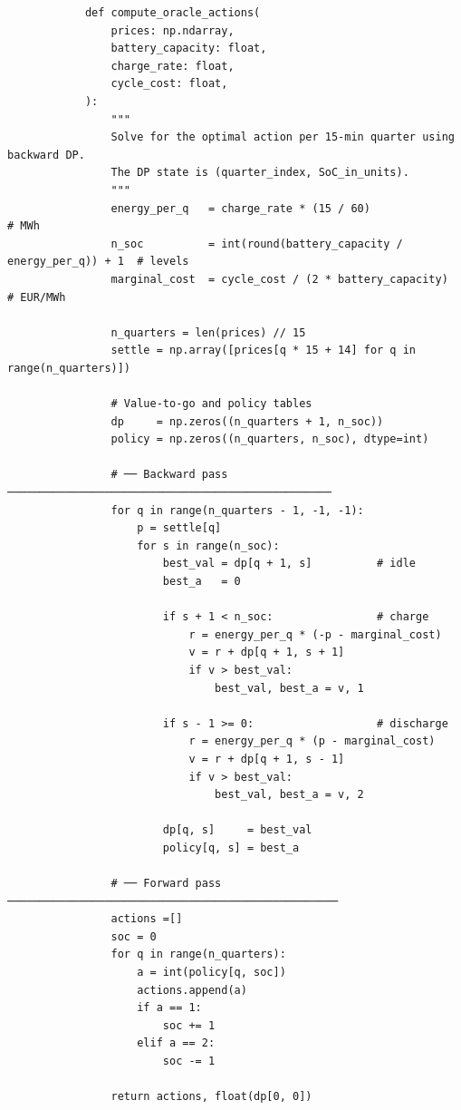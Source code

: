             \begin{listing}[ht]
            \begin{verbatim}
            def compute_oracle_actions(
                prices: np.ndarray,
                battery_capacity: float,
                charge_rate: float,
                cycle_cost: float,
            ):
                """
                Solve for the optimal action per 15-min quarter using backward DP.
                The DP state is (quarter_index, SoC_in_units).
                """
                energy_per_q   = charge_rate * (15 / 60)                          # MWh
                n_soc          = int(round(battery_capacity / energy_per_q)) + 1  # levels
                marginal_cost  = cycle_cost / (2 * battery_capacity)              # EUR/MWh
            
                n_quarters = len(prices) // 15
                settle = np.array([prices[q * 15 + 14] for q in range(n_quarters)])
            
                # Value-to-go and policy tables
                dp     = np.zeros((n_quarters + 1, n_soc))
                policy = np.zeros((n_quarters, n_soc), dtype=int)
            
                # ── Backward pass ──────────────────────────────────────────────────
                for q in range(n_quarters - 1, -1, -1):
                    p = settle[q]
                    for s in range(n_soc):
                        best_val = dp[q + 1, s]          # idle
                        best_a   = 0
            
                        if s + 1 < n_soc:                # charge
                            r = energy_per_q * (-p - marginal_cost)
                            v = r + dp[q + 1, s + 1]
                            if v > best_val:
                                best_val, best_a = v, 1
            
                        if s - 1 >= 0:                   # discharge
                            r = energy_per_q * (p - marginal_cost)
                            v = r + dp[q + 1, s - 1]
                            if v > best_val:
                                best_val, best_a = v, 2
            
                        dp[q, s]     = best_val
                        policy[q, s] = best_a
            
                # ── Forward pass ───────────────────────────────────────────────────
                actions =[]
                soc = 0
                for q in range(n_quarters):
                    a = int(policy[q, soc])
                    actions.append(a)
                    if a == 1:
                        soc += 1
                    elif a == 2:
                        soc -= 1
            
                return actions, float(dp[0, 0])
            \end{verbatim}
            \caption{Python implementation of the Oracle agent using exact Backward Dynamic Programming to find the optimal trading trajectory.}
            \label{lst:oracle_dp}
            \end{listing}
            
